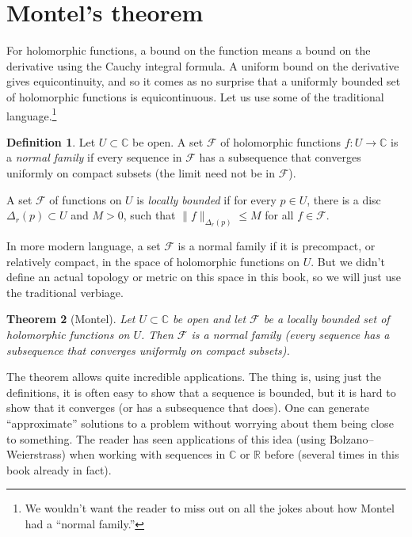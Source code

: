 \documentclass[12pt,openany]{book}
\newcommand{\snorm}[1]{\lVert {#1} \rVert}
\newcommand{\C}{{\mathbb{C}}}
\newcommand{\R}{{\mathbb{R}}}
\newcommand{\sF}{{\mathscr{F}}}
\newcommand{\myindex}[1]{#1\index{#1}}
\newcommand{\myquote}[1]{``#1''}
\theoremstyle{plain}
\newtheorem{thm}{Theorem}[section]
\theoremstyle{remark}
\theoremstyle{definition}
\newtheorem{defn}[thm]{Definition}
\theoremstyle{exercise}
\theoremstyle{example}
\begin{document}

\section{Montel's theorem}
\label{sec:montel}

For holomorphic functions, a bound on the function means a
bound on the derivative using the Cauchy integral formula.  A uniform
bound on the derivative gives equicontinuity, and
so it comes as no
surprise that a uniformly bounded set of holomorphic functions
is equicontinuous.
Let us use some of the traditional language.\footnote{%
We wouldn't want the reader to miss out on all the
jokes about how Montel had a \myquote{normal family.}}

\begin{defn}
Let $U \subset \C$ be open.
A set $\sF$ of holomorphic functions $f \colon U \to \C$ is a
\emph{\myindex{normal family}} if every sequence in $\sF$ has a subsequence
that converges uniformly on compact subsets (the limit need not be in $\sF$).

A set $\sF$ of functions on $U$ is \emph{\myindex{locally bounded}}
if for every $p \in U$, there is a disc $\Delta_r(p) \subset U$ and $M > 0$,
such that 
$\snorm{f}_{\Delta_r(p)} \leq M$ for all $f \in \sF$.
\end{defn}

In more modern language, a set $\sF$ is a normal family if it is precompact, or
relatively compact, in the space of holomorphic functions on $U$.  But we
didn't define an actual topology or metric on this space in this book, so
we will just use the traditional verbiage.

\begin{thm}[Montel]
Let $U \subset \C$ be open and let $\sF$
be a locally bounded set of holomorphic functions on $U$.
Then $\sF$ is a normal family (every sequence has a subsequence that
converges uniformly on compact subsets).
\end{thm}

The theorem allows quite incredible applications.  The thing is,
using just the definitions, it is often easy to show that a sequence is bounded,
but it is hard to show that it converges (or has a subsequence that does).
One can generate \myquote{approximate} solutions to a problem without worrying
about them being close to something.
The reader has seen applications of this idea (using Bolzano--Weierstrass)
when working with sequences in $\C$ or $\R$ before (several times in this
book already in fact).
\end{document}

